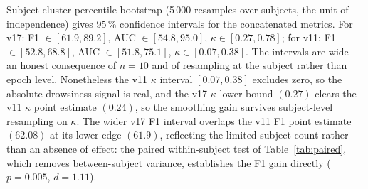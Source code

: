 \documentclass[journal]{IEEEtran}
\begin{document}
Subject-cluster percentile bootstrap (5\,000 resamples over subjects, the unit of independence) gives 95\,\% confidence intervals for the concatenated metrics. For v17: F1 \(\in [61.9, 89.2]\), AUC \(\in [54.8, 95.0]\), \(\kappa \in [0.27, 0.78]\); for v11: F1 \(\in [52.8, 68.8]\), AUC \(\in [51.8, 75.1]\), \(\kappa \in [0.07, 0.38]\). The intervals are wide --- an honest consequence of \(n=10\) and of resampling at the subject rather than epoch level. Nonetheless the v11 \(\kappa\) interval \([0.07, 0.38]\) excludes zero, so the absolute drowsiness signal is real, and the v17 \(\kappa\) lower bound \((0.27)\) clears the v11 \(\kappa\) point estimate \((0.24)\), so the smoothing gain survives subject-level resampling on \(\kappa\). The wider v17 F1 interval overlaps the v11 F1 point estimate \((62.08)\) at its lower edge \((61.9)\), reflecting the limited subject count rather than an absence of effect: the paired within-subject test of Table~\ref{tab:paired}, which removes between-subject variance, establishes the F1 gain directly (\(p=0.005\), \(d=1.11\)).
\end{document}
